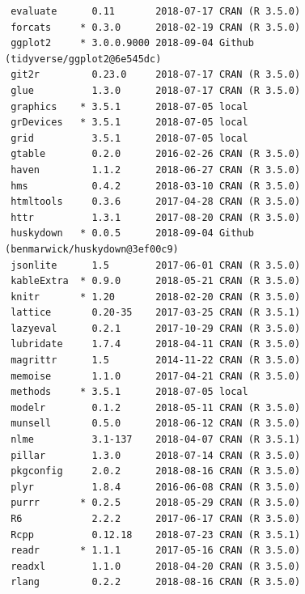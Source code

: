 \documentclass[twoside,12pt,final]{ucthesis-CA2012} %
\begin{document}
\begin{ucmainmatter}
\begin{verbatim}
 evaluate      0.11       2018-07-17 CRAN (R 3.5.0)                       
 forcats     * 0.3.0      2018-02-19 CRAN (R 3.5.0)                       
 ggplot2     * 3.0.0.9000 2018-09-04 Github (tidyverse/ggplot2@6e545dc)   
 git2r         0.23.0     2018-07-17 CRAN (R 3.5.0)                       
 glue          1.3.0      2018-07-17 CRAN (R 3.5.0)                       
 graphics    * 3.5.1      2018-07-05 local                                
 grDevices   * 3.5.1      2018-07-05 local                                
 grid          3.5.1      2018-07-05 local                                
 gtable        0.2.0      2016-02-26 CRAN (R 3.5.0)                       
 haven         1.1.2      2018-06-27 CRAN (R 3.5.0)                       
 hms           0.4.2      2018-03-10 CRAN (R 3.5.0)                       
 htmltools     0.3.6      2017-04-28 CRAN (R 3.5.0)                       
 httr          1.3.1      2017-08-20 CRAN (R 3.5.0)                       
 huskydown   * 0.0.5      2018-09-04 Github (benmarwick/huskydown@3ef00c9)
 jsonlite      1.5        2017-06-01 CRAN (R 3.5.0)                       
 kableExtra  * 0.9.0      2018-05-21 CRAN (R 3.5.0)                       
 knitr       * 1.20       2018-02-20 CRAN (R 3.5.0)                       
 lattice       0.20-35    2017-03-25 CRAN (R 3.5.1)                       
 lazyeval      0.2.1      2017-10-29 CRAN (R 3.5.0)                       
 lubridate     1.7.4      2018-04-11 CRAN (R 3.5.0)                       
 magrittr      1.5        2014-11-22 CRAN (R 3.5.0)                       
 memoise       1.1.0      2017-04-21 CRAN (R 3.5.0)                       
 methods     * 3.5.1      2018-07-05 local                                
 modelr        0.1.2      2018-05-11 CRAN (R 3.5.0)                       
 munsell       0.5.0      2018-06-12 CRAN (R 3.5.0)                       
 nlme          3.1-137    2018-04-07 CRAN (R 3.5.1)                       
 pillar        1.3.0      2018-07-14 CRAN (R 3.5.0)                       
 pkgconfig     2.0.2      2018-08-16 CRAN (R 3.5.0)                       
 plyr          1.8.4      2016-06-08 CRAN (R 3.5.0)                       
 purrr       * 0.2.5      2018-05-29 CRAN (R 3.5.0)                       
 R6            2.2.2      2017-06-17 CRAN (R 3.5.0)                       
 Rcpp          0.12.18    2018-07-23 CRAN (R 3.5.1)                       
 readr       * 1.1.1      2017-05-16 CRAN (R 3.5.0)                       
 readxl        1.1.0      2018-04-20 CRAN (R 3.5.0)                       
 rlang         0.2.2      2018-08-16 CRAN (R 3.5.0)                       

\end{verbatim}
\end{ucmainmatter}
\end{document}
